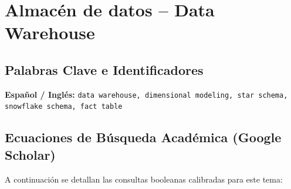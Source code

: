 \section{Almacén de datos – Data Warehouse}
\label{sec:07_data_warehouse}


\subsection{Palabras Clave e Identificadores}
\textbf{Español / Inglés:} \texttt{data warehouse, dimensional modeling, star schema, snowflake schema, fact table}


\subsection{Ecuaciones de Búsqueda Académica (Google Scholar)}
A continuación se detallan las consultas booleanas calibradas para este tema:

